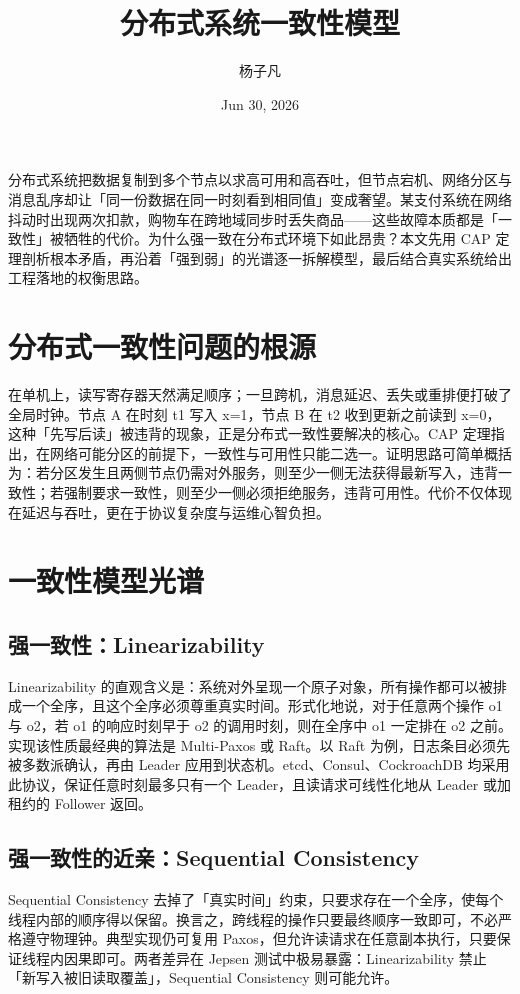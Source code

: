 \title{分布式系统一致性模型}
\author{杨子凡}
\date{Jun 30, 2026}
\maketitle
分布式系统把数据复制到多个节点以求高可用和高吞吐，但节点宕机、网络分区与消息乱序却让「同一份数据在同一时刻看到相同值」变成奢望。某支付系统在网络抖动时出现两次扣款，购物车在跨地域同步时丢失商品——这些故障本质都是「一致性」被牺牲的代价。为什么强一致在分布式环境下如此昂贵？本文先用 CAP 定理剖析根本矛盾，再沿着「强到弱」的光谱逐一拆解模型，最后结合真实系统给出工程落地的权衡思路。\par
\chapter{分布式一致性问题的根源}
在单机上，读写寄存器天然满足顺序；一旦跨机，消息延迟、丢失或重排便打破了全局时钟。节点 A 在时刻 t1 写入 x=1，节点 B 在 t2 收到更新之前读到 x=0，这种「先写后读」被违背的现象，正是分布式一致性要解决的核心。CAP 定理指出，在网络可能分区的前提下，一致性与可用性只能二选一。证明思路可简单概括为：若分区发生且两侧节点仍需对外服务，则至少一侧无法获得最新写入，违背一致性；若强制要求一致性，则至少一侧必须拒绝服务，违背可用性。代价不仅体现在延迟与吞吐，更在于协议复杂度与运维心智负担。\par
\chapter{一致性模型光谱}
\section{强一致性：Linearizability}
Linearizability 的直观含义是：系统对外呈现一个原子对象，所有操作都可以被排成一个全序，且这个全序必须尊重真实时间。形式化地说，对于任意两个操作 o1 与 o2，若 o1 的响应时刻早于 o2 的调用时刻，则在全序中 o1 一定排在 o2 之前。实现该性质最经典的算法是 Multi-Paxos 或 Raft。以 Raft 为例，日志条目必须先被多数派确认，再由 Leader 应用到状态机。etcd、Consul、CockroachDB 均采用此协议，保证任意时刻最多只有一个 Leader，且读请求可线性化地从 Leader 或加租约的 Follower 返回。\par
\section{强一致性的近亲：Sequential Consistency}
Sequential Consistency 去掉了「真实时间」约束，只要求存在一个全序，使每个线程内部的顺序得以保留。换言之，跨线程的操作只要最终顺序一致即可，不必严格遵守物理钟。典型实现仍可复用 Paxos，但允许读请求在任意副本执行，只要保证线程内因果即可。两者差异在 Jepsen 测试中极易暴露：Linearizability 禁止「新写入被旧读取覆盖」，Sequential Consistency 则可能允许。\par
